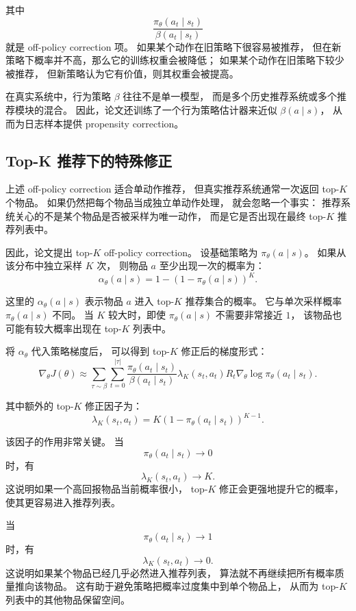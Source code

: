 \documentclass[11pt]{ctexart}
\begin{document}
其中
\[
\frac{
\pi_{\theta}(a_t\mid s_t)
}{
\beta(a_t\mid s_t)
}
\]
就是 off-policy correction 项。
如果某个动作在旧策略下很容易被推荐，
但在新策略下概率并不高，那么它的训练权重会被降低；
如果某个动作在旧策略下较少被推荐，
但新策略认为它有价值，则其权重会被提高。

在真实系统中，行为策略 $\beta$ 往往不是单一模型，
而是多个历史推荐系统或多个推荐模块的混合。
因此，论文还训练了一个行为策略估计器来近似 $\beta(a\mid s)$，
从而为日志样本提供 propensity correction。

\subsection{Top-K 推荐下的特殊修正}

上述 off-policy correction 适合单动作推荐，
但真实推荐系统通常一次返回 top-$K$ 个物品。
如果仍然把每个物品当成独立单动作处理，
就会忽略一个事实：
推荐系统关心的不是某个物品是否被采样为唯一动作，
而是它是否出现在最终 top-$K$ 推荐列表中。

因此，论文提出 top-$K$ off-policy correction。
设基础策略为 $\pi_{\theta}(a\mid s)$。
如果从该分布中独立采样 $K$ 次，
则物品 $a$ 至少出现一次的概率为：
\[
\alpha_{\theta}(a\mid s)
=
1-
\left(
1-\pi_{\theta}(a\mid s)
\right)^K.
\]

这里的 $\alpha_{\theta}(a\mid s)$ 表示物品 $a$ 进入 top-$K$ 推荐集合的概率。
它与单次采样概率 $\pi_{\theta}(a\mid s)$ 不同。
当 $K$ 较大时，即使 $\pi_{\theta}(a\mid s)$ 不需要非常接近 $1$，
该物品也可能有较大概率出现在 top-$K$ 列表中。

将 $\alpha_{\theta}$ 代入策略梯度后，
可以得到 top-$K$ 修正后的梯度形式：
\[
\nabla_{\theta}J(\theta)
\approx
\sum_{\tau\sim \beta}
\sum_{t=0}^{|\tau|}
\frac{
\pi_{\theta}(a_t\mid s_t)
}{
\beta(a_t\mid s_t)
}
\lambda_K(s_t,a_t)
R_t
\nabla_{\theta}
\log \pi_{\theta}(a_t\mid s_t).
\]

其中额外的 top-$K$ 修正因子为：
\[
\lambda_K(s_t,a_t)
=
K
\left(
1-\pi_{\theta}(a_t\mid s_t)
\right)^{K-1}.
\]

该因子的作用非常关键。
当
\[
\pi_{\theta}(a_t\mid s_t)\rightarrow 0
\]
时，有
\[
\lambda_K(s_t,a_t)\rightarrow K.
\]
这说明如果一个高回报物品当前概率很小，
top-$K$ 修正会更强地提升它的概率，
使其更容易进入推荐列表。

当
\[
\pi_{\theta}(a_t\mid s_t)\rightarrow 1
\]
时，有
\[
\lambda_K(s_t,a_t)\rightarrow 0.
\]
这说明如果某个物品已经几乎必然进入推荐列表，
算法就不再继续把所有概率质量推向该物品。
这有助于避免策略把概率过度集中到单个物品上，
从而为 top-$K$ 列表中的其他物品保留空间。
\end{document}
